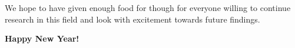 


We hope to have given enough food for though for everyone willing to continue research in this field and look with excitement towards future findings.

\textbf{Happy New Year!}
